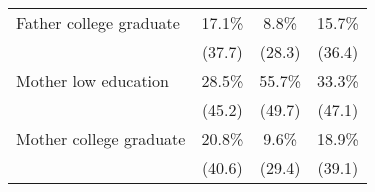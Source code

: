 \begin{table}[!ht]
\begin{center}
\begin{tabular}{l*{3}{c}}
Father college graduate  &       17.1\%  &      8.8\% &       15.7\%\\
             &     (37.7) &     (28.3) &     (36.4)\\
Mother low education &       28.5\% &       55.7\% &       33.3\%\\
             &     (45.2) &     (49.7) &     (47.1)\\
Mother college graduate &       20.8\% &       9.6\% &       18.9\%\\
             &     (40.6) &     (29.4) &     (39.1)\\

\end{tabular}
\end{center}
\end{table}
